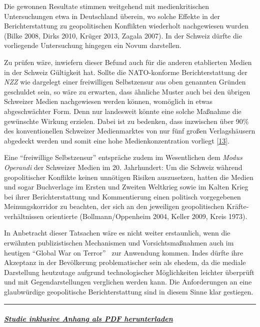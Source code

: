 Die gewonnen Resultate stimmen weitgehend mit medienkritischen
Untersuchungen etwa in Deutschland überein, wo solche Effekte in der
Berichterstattung zu geopolitischen Konflikten wiederholt nachgewiesen
wurden (Bilke 2008, Dirks 2010, Krüger 2013, Zagala 2007). In der
Schweiz dürfte die vorliegende Untersuchung hingegen ein Novum
darstellen.

Zu prüfen wäre, inwiefern dieser Befund auch für die anderen etablierten
Medien in der Schweiz Gültigkeit hat. Sollte die NATO-konforme
Berichterstattung der \emph{NZZ} wie dargelegt einer freiwilligen
Selbstzensur aus oben genannten Gründen geschuldet sein, so wäre zu
erwarten, dass ähnliche Muster auch bei den übrigen Schweizer Medien
nachgewiesen werden können, womöglich in etwas abgeschwächter Form. Denn
nur landesweit könnte eine solche Maßnahme die gewünschte Wirkung
erzielen. Dabei ist zu bedenken, dass inzwischen über 90\% des
konventionellen Schweizer Medienmarktes von nur fünf großen
Verlagshäusern abgedeckt werden und somit eine hohe Medien­konzentration
vorliegt {[}\protect\hyperlink{anm13}{13}{]}.

Eine ``freiwillige Selbstzensur'' entspräche zudem im Wesentlichen dem
\emph{Modus Operandi} der Schweizer Medien im 20. Jahrhundert: Um die
Schweiz während geopolitischer Konflikte keinen unnötigen Risiken
auszusetzen, hatten die Medien und sogar Buchverlage im Ersten und
Zweiten Weltkrieg sowie im Kalten Krieg bei ihrer Berichterstattung und
Kommentierung einen politisch vorgegebenen Meinungskorridor zu beachten,
der sich an den jeweiligen geopolitischen Kräfte­verhältnissen
orientierte (Bollmann/Oppenheim 2004, Keller 2009, Kreis 1973).

In Anbetracht dieser Tatsachen wäre es nicht weiter erstaunlich, wenn
die erwähnten publizistischen Mechanismen und Vorsichts­maßnahmen auch
im heutigen ``Global War on Terror''~ zur Anwendung kommen. Indes dürfte
ihre Akzeptanz in der Bevölkerung pro­blema­tischer sein als ehedem, da
die mediale Darstellung heutzutage aufgrund techno­logischer
Möglich­keiten leichter überprüft und mit Gegen­darstellungen verglichen
werden kann. Die Anforderungen an eine glaubwürdige geopolitische
Berichterstattung sind in diesem Sinne klar gestiegen.

\begin{center}\rule{0.5\linewidth}{\linethickness}\end{center}

\hypertarget{studie-inklusive-anhang-als-pdf-herunterladen}{%
\subparagraph{\texorpdfstring{\href{https://swprs.files.wordpress.com/2017/12/nzz-propaganda-studie-2016tp.pdf}{Studie
inklusive Anhang als PDF
herunterladen}}{Studie inklusive Anhang als PDF herunterladen}}\label{studie-inklusive-anhang-als-pdf-herunterladen}}

